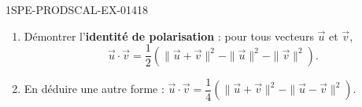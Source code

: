 \begin{exercice}{1SPE-PRODSCAL-EX-014}{1}{8}
\begin{enumerate}
  \item Démontrer l'\textbf{identité de polarisation} : pour tous vecteurs $\vec{u}$ et $\vec{v}$,
  \[
  \vec{u} \cdot \vec{v} = \frac{1}{2}\left(\|\vec{u} + \vec{v}\|^2 - \|\vec{u}\|^2 - \|\vec{v}\|^2\right).
  \]
  \item En déduire une autre forme : $\vec{u} \cdot \vec{v} = \dfrac{1}{4}\left(\|\vec{u} + \vec{v}\|^2 - \|\vec{u} - \vec{v}\|^2\right)$.
\end{enumerate}
\end{exercice}
